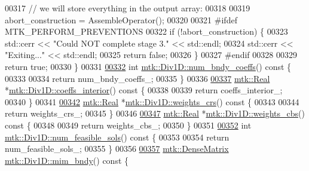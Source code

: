 \begin{DoxyCode}
{{00317   \textcolor{comment}{// we will store everything in the output array:}
00318 
00319   abort\_construction = AssembleOperator();
00320 
00321 \textcolor{preprocessor}{  #ifdef MTK\_PERFORM\_PREVENTIONS}
00322   \textcolor{keywordflow}{if} (!abort\_construction) \{
00323     std::cerr << \textcolor{stringliteral}{"Could NOT complete stage 3."} << std::endl;
00324     std::cerr << \textcolor{stringliteral}{"Exiting..."} << std::endl;
00325     \textcolor{keywordflow}{return} \textcolor{keyword}{false};
00326   \}
00327 \textcolor{preprocessor}{  #endif}
00328 
00329   \textcolor{keywordflow}{return} \textcolor{keyword}{true};
00330 \}
00331 
\hypertarget{mtk__div__1d_8cc_source_l00332}{}\hyperlink{classmtk_1_1Div1D_a975cb2a91ed6806f6fc0a3a5b01b01b1}{00332} \textcolor{keywordtype}{int} \hyperlink{classmtk_1_1Div1D_a975cb2a91ed6806f6fc0a3a5b01b01b1}{mtk::Div1D::num\_bndy\_coeffs}()\textcolor{keyword}{ const }\{
00333 
00334   \textcolor{keywordflow}{return} num\_bndy\_coeffs\_;
00335 \}
00336 
\hypertarget{mtk__div__1d_8cc_source_l00337}{}\hyperlink{classmtk_1_1Div1D_a0916b5e84b019b4b6a33d0a45d829513}{00337} \hyperlink{group__c01-roots_gac080bbbf5cbb5502c9f00405f894857d}{mtk::Real} *\hyperlink{classmtk_1_1Div1D_a0916b5e84b019b4b6a33d0a45d829513}{mtk::Div1D::coeffs\_interior}()\textcolor{keyword}{ const }\{
00338 
00339   \textcolor{keywordflow}{return} coeffs\_interior\_;
00340 \}
00341 
\hypertarget{mtk__div__1d_8cc_source_l00342}{}\hyperlink{classmtk_1_1Div1D_ab5c791285e7e51a85b8c62a1b0ab9126}{00342} \hyperlink{group__c01-roots_gac080bbbf5cbb5502c9f00405f894857d}{mtk::Real} *\hyperlink{classmtk_1_1Div1D_ab5c791285e7e51a85b8c62a1b0ab9126}{mtk::Div1D::weights\_crs}()\textcolor{keyword}{ const }\{
00343 
00344   \textcolor{keywordflow}{return} weights\_crs\_;
00345 \}
00346 
\hypertarget{mtk__div__1d_8cc_source_l00347}{}\hyperlink{classmtk_1_1Div1D_a5d4fe8c61ce41cb1134a3f9cb16deb59}{00347} \hyperlink{group__c01-roots_gac080bbbf5cbb5502c9f00405f894857d}{mtk::Real} *\hyperlink{classmtk_1_1Div1D_a5d4fe8c61ce41cb1134a3f9cb16deb59}{mtk::Div1D::weights\_cbs}()\textcolor{keyword}{ const }\{
00348 
00349   \textcolor{keywordflow}{return} weights\_cbs\_;
00350 \}
00351 
\hypertarget{mtk__div__1d_8cc_source_l00352}{}\hyperlink{classmtk_1_1Div1D_a033d486957071e6addf1d2d4d5dc95cc}{00352} \textcolor{keywordtype}{int} \hyperlink{classmtk_1_1Div1D_a033d486957071e6addf1d2d4d5dc95cc}{mtk::Div1D::num\_feasible\_sols}()\textcolor{keyword}{ const }\{
00353 
00354   \textcolor{keywordflow}{return} num\_feasible\_sols\_;
00355 \}
00356 
\hypertarget{mtk__div__1d_8cc_source_l00357}{}\hyperlink{classmtk_1_1Div1D_a2c844ef39825e73e4024d35fcdd42b12}{00357} \hyperlink{classmtk_1_1DenseMatrix}{mtk::DenseMatrix} \hyperlink{classmtk_1_1Div1D_a2c844ef39825e73e4024d35fcdd42b12}{mtk::Div1D::mim\_bndy}()\textcolor{keyword}{ const }\{
}}
\end{DoxyCode}
